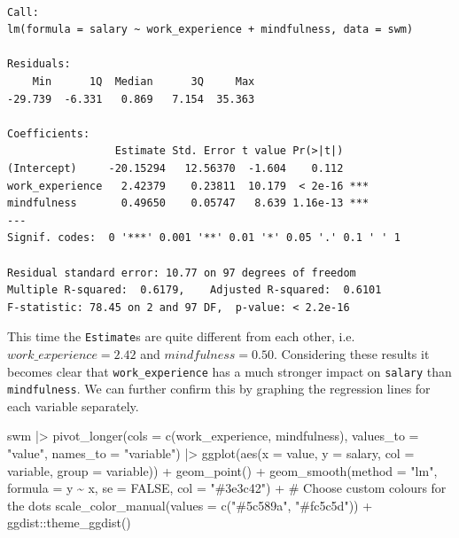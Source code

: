 \documentclass[
  letterpaper,
]{krantz}
\makeatletter
\newenvironment{Shaded}{\begin{snugshade}}{\end{snugshade}}
\newcommand{\AttributeTok}[1]{\textcolor[rgb]{0.40,0.45,0.13}{#1}}
\newcommand{\CommentTok}[1]{\textcolor[rgb]{0.37,0.37,0.37}{#1}}
\newcommand{\ConstantTok}[1]{\textcolor[rgb]{0.56,0.35,0.01}{#1}}
\newcommand{\FunctionTok}[1]{\textcolor[rgb]{0.28,0.35,0.67}{#1}}
\newcommand{\NormalTok}[1]{\textcolor[rgb]{0.00,0.23,0.31}{#1}}
\newcommand{\SpecialCharTok}[1]{\textcolor[rgb]{0.37,0.37,0.37}{#1}}
\newcommand{\StringTok}[1]{\textcolor[rgb]{0.13,0.47,0.30}{#1}}
\newenvironment{kframe}{%
\medskip{}
\setlength{\fboxsep}{.8em}
 \def\at@end@of@kframe{}%
 \ifinner\ifhmode%
  \def\at@end@of@kframe{\end{minipage}}%
  \begin{minipage}{\columnwidth}%
 \fi\fi%
 \def\FrameCommand##1{\hskip\@totalleftmargin \hskip-\fboxsep
 \colorbox{shadecolor}{##1}\hskip-\fboxsep
     \hskip-\linewidth \hskip-\@totalleftmargin \hskip\columnwidth}%
 \MakeFramed {\advance\hsize-\width
   \@totalleftmargin\z@ \linewidth\hsize
   \@setminipage}}%
 {\par\unskip\endMakeFramed%
 \at@end@of@kframe}
\renewenvironment{Shaded}{\begin{kframe}}{\end{kframe}}
\makeatother
\begin{document}
\begin{verbatim}

Call:
lm(formula = salary ~ work_experience + mindfulness, data = swm)

Residuals:
    Min      1Q  Median      3Q     Max 
-29.739  -6.331   0.869   7.154  35.363 

Coefficients:
                 Estimate Std. Error t value Pr(>|t|)    
(Intercept)     -20.15294   12.56370  -1.604    0.112    
work_experience   2.42379    0.23811  10.179  < 2e-16 ***
mindfulness       0.49650    0.05747   8.639 1.16e-13 ***
---
Signif. codes:  0 '***' 0.001 '**' 0.01 '*' 0.05 '.' 0.1 ' ' 1

Residual standard error: 10.77 on 97 degrees of freedom
Multiple R-squared:  0.6179,    Adjusted R-squared:  0.6101 
F-statistic: 78.45 on 2 and 97 DF,  p-value: < 2.2e-16
\end{verbatim}

This time the \texttt{Estimate}s are quite different from each other,
i.e.~\(work\_experience = 2.42\) and \(mindfulness = 0.50\). Considering
these results it becomes clear that \texttt{work\_experience} has a much
stronger impact on \texttt{salary} than \texttt{mindfulness}. We can
further confirm this by graphing the regression lines for each variable
separately.

\begin{Shaded}
\begin{Highlighting}[]
\NormalTok{swm }\SpecialCharTok{|\textgreater{}}
  \FunctionTok{pivot\_longer}\NormalTok{(}\AttributeTok{cols =} \FunctionTok{c}\NormalTok{(work\_experience, mindfulness),}
               \AttributeTok{values\_to =} \StringTok{"value"}\NormalTok{,}
               \AttributeTok{names\_to =} \StringTok{"variable"}\NormalTok{) }\SpecialCharTok{|\textgreater{}}
  \FunctionTok{ggplot}\NormalTok{(}\FunctionTok{aes}\NormalTok{(}\AttributeTok{x =}\NormalTok{ value,}
             \AttributeTok{y =}\NormalTok{ salary,}
             \AttributeTok{col =}\NormalTok{ variable,}
             \AttributeTok{group =}\NormalTok{ variable)) }\SpecialCharTok{+}
  \FunctionTok{geom\_point}\NormalTok{() }\SpecialCharTok{+}
  \FunctionTok{geom\_smooth}\NormalTok{(}\AttributeTok{method =} \StringTok{"lm"}\NormalTok{,}
              \AttributeTok{formula =}\NormalTok{ y }\SpecialCharTok{\textasciitilde{}}\NormalTok{ x,}
              \AttributeTok{se =} \ConstantTok{FALSE}\NormalTok{,}
              \AttributeTok{col =} \StringTok{"\#3e3c42"}\NormalTok{) }\SpecialCharTok{+}
  \CommentTok{\# Choose custom colours for the dots}
  \FunctionTok{scale\_color\_manual}\NormalTok{(}\AttributeTok{values =} \FunctionTok{c}\NormalTok{(}\StringTok{"\#5c589a"}\NormalTok{, }\StringTok{"\#fc5c5d"}\NormalTok{)) }\SpecialCharTok{+}
\NormalTok{  ggdist}\SpecialCharTok{::}\FunctionTok{theme\_ggdist}\NormalTok{()}
\end{Highlighting}
\end{Shaded}
\end{document}
